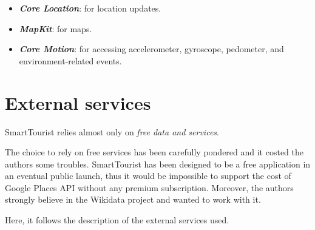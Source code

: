\documentclass[a4paper, 11pt, parskip=half]{scrreprt}
\theoremstyle{definition}
\newenvironment{info}[1][Info:]{ %
	\medskip
	\begin{mdframed}[style=info]
		\noindent{\textbf{#1}}
}{
	\end{mdframed}
}
\begin{document}
\begin{itemize}
    \item \textbf{\textit{Core Location}}: for location updates.
	\item \textbf{\textit{MapKit}}: for maps.
	\item \textbf{\textit{Core Motion}}: for accessing accelerometer, gyroscope, pedometer, and environment-related events.
\end{itemize}

\section{External services}

SmartTourist relies almost only on \textit{free data and services}. 

\begin{info}
The choice to rely on free services has been carefully pondered and it costed the authors some troubles. SmartTourist has been designed to be a free application in an eventual public launch, thus it would be impossible to support the cost of Google Places API without any premium subscription. Moreover, the authors strongly believe in the Wikidata project and wanted to work with it.
\end{info}

Here, it follows the description of the external services used.
\end{document}
